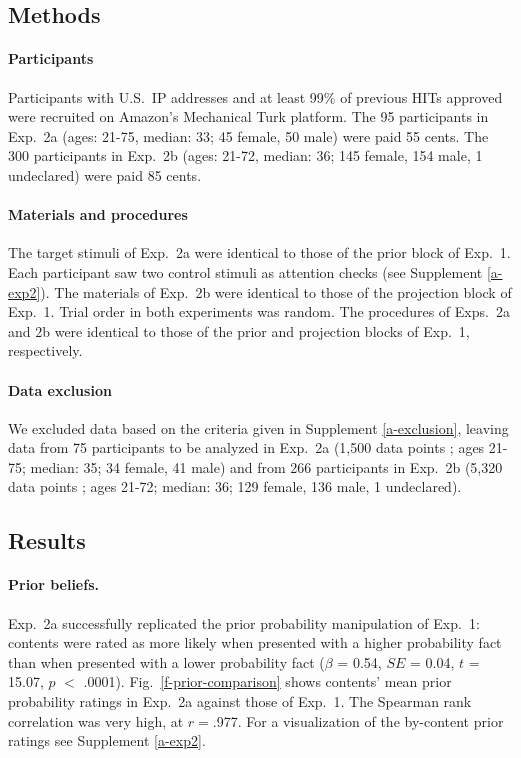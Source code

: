 \documentclass[11pt,fleqn]{article}
\newcommand{\jt}[1]{\textbf{\color{blue}JT: #1}}
\newcommand{\figref}[1]{Fig.~\ref{#1}}
\newcommand{\6}{\mbox{$[\hspace*{-.6mm}[$}}
\newcommand{\9}{\mbox{$]\hspace*{-.6mm}]$}}
\begin{document}
\subsection{Methods}


\paragraph{Participants} Participants with U.S.\ IP addresses and at least 99\% of previous HITs approved were recruited on Amazon's Mechanical Turk platform. The 95 participants in Exp.~2a (ages: 21-75, median: 33; 45 female, 50 male) were paid 55 cents. The 300 participants in Exp.~2b (ages: 21-72, median: 36; 145 female, 154 male, 1 undeclared) were paid 85 cents.

\paragraph{Materials and procedures} The target stimuli of Exp.~2a were identical to those of the prior block of Exp.~1. Each participant saw two control stimuli as attention checks (see Supplement \ref{a-exp2}). The materials of Exp.~2b were identical to those of the projection block of Exp.~1. Trial order in both experiments was random. The procedures of Exps.~2a and 2b were identical to those of the prior and projection blocks of Exp.~1, respectively.

\paragraph{Data exclusion} We excluded data based on the criteria given in Supplement \ref{a-exclusion}, leaving data from 75 participants to be analyzed in Exp.~2a (1,500 data points%
; ages 21-75; median: 35; 34 female, 41 male) and from 266 participants in Exp.~2b (5,320 data points%
; ages 21-72; median: 36; 129 female, 136 male, 1 undeclared).

\subsection{Results}

\paragraph{Prior beliefs.} Exp.~2a successfully replicated the prior probability manipulation of Exp.~1: contents were rated as more likely when presented with a higher probability fact than when  presented with a lower probability fact ($\beta$ = 0.54, $SE$ = 0.04, $t$ = 15.07, $p$ $<$ .0001).  \figref{f-prior-comparison} shows contents' mean prior probability ratings in Exp.~2a against those of Exp.~1. The Spearman rank correlation was very high, at $r=$.977. For a visualization of the by-content prior ratings see Supplement \ref{a-exp2}.
\end{document}
